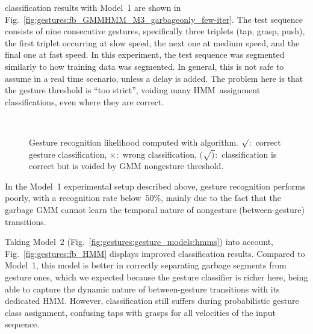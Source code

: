 \FB{} classification results with Model~1 are shown in Fig.~\ref{fig:gestures:fb_GMMHMM_M3_garbageonly_few-iter}. The test sequence consists of nine consecutive gestures, specifically three triplets (tap, grasp, push), the first triplet occurring at slow speed, the next one at medium speed, and the final one at fast speed. In this experiment, the test sequence was segmented similarly to how training data was segmented. In general, this is not safe to assume in a real time scenario, unless a delay is added. The problem here is that the gesture threshold is ``too strict'', voiding many \ac{HMM}~assignment classifications, even where they are correct.

\begin{figure}
%
 \\
%
%
\caption[Gesture recognition likelihood computed with \FB{} algorithm.]{Gesture recognition likelihood computed with \FB{} algorithm. $\surd$:~correct gesture classification, $\times$:~wrong classification, $(\surd)$:~classification is correct but is voided by \ac{GMM} nongesture threshold.}
\label{fig:gestures:fb}
\end{figure}

In the Model~1 experimental setup described above, gesture recognition performs poorly, with a recognition rate below~$50\%$, mainly due to the fact that the garbage \ac{GMM} cannot learn the temporal nature of nongesture (between-gesture) transitions.

Taking Model~2 (Fig.~\ref{fig:gestures:gesture_models:hmms}) into account, Fig.~\ref{fig:gestures:fb_HMM} displays improved \FB{} classification results. Compared to Model~1, this model is better in correctly separating garbage segments from gesture ones, which we expected because the gesture classifier is richer here, being able to capture the dynamic nature of between-gesture transitions with its dedicated \ac{HMM}. However, classification still suffers during probabilistic gesture class assignment, confusing taps with grasps for all velocities of the input sequence.

